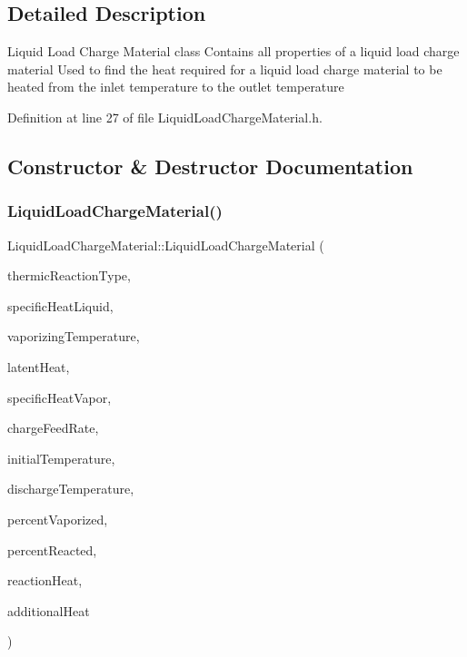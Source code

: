 \subsection{Detailed Description}
Liquid Load Charge Material class Contains all properties of a liquid load charge material Used to find the heat required for a liquid load charge material to be heated from the inlet temperature to the outlet temperature 

Definition at line 27 of file Liquid\+Load\+Charge\+Material.\+h.



\subsection{Constructor \& Destructor Documentation}
\mbox{\label{class_liquid_load_charge_material_ab6b2ef342701227c60dc380f5a576085}} 
\subsubsection{\texorpdfstring{Liquid\+Load\+Charge\+Material()}{LiquidLoadChargeMaterial()}}
{\footnotesize\ttfamily Liquid\+Load\+Charge\+Material\+::\+Liquid\+Load\+Charge\+Material (\begin{DoxyParamCaption}\item[{const \hyperlink{class_load_charge_material_a51d4263e865a5d86236622dd3fe23fd1}{Load\+Charge\+Material\+::\+Thermic\+Reaction\+Type}}]{thermic\+Reaction\+Type,  }\item[{const double}]{specific\+Heat\+Liquid,  }\item[{const double}]{vaporizing\+Temperature,  }\item[{const double}]{latent\+Heat,  }\item[{const double}]{specific\+Heat\+Vapor,  }\item[{const double}]{charge\+Feed\+Rate,  }\item[{const double}]{initial\+Temperature,  }\item[{const double}]{discharge\+Temperature,  }\item[{const double}]{percent\+Vaporized,  }\item[{const double}]{percent\+Reacted,  }\item[{const double}]{reaction\+Heat,  }\item[{const double}]{additional\+Heat }\end{DoxyParamCaption})\hspace{0.3cm}{\ttfamily [inline]}}

